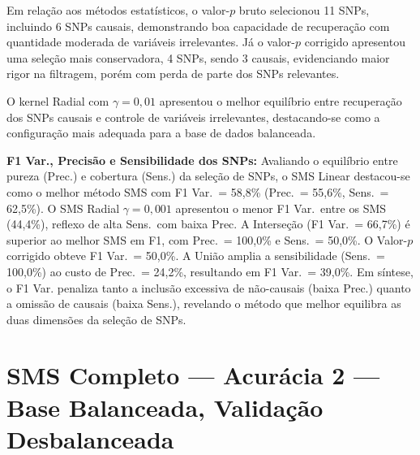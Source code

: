 \documentclass[
    12pt,
    a4paper,
    oneside,
    english,
    french,
    spanish,
    brazil
    ]{abntex2}
\newcommand{\novo}[1]{\textcolor{corNova}{#1}}
\begin{document}
Em relação aos métodos estatísticos, o valor-$p$ bruto selecionou 11 SNPs, incluindo 6 SNPs causais, demonstrando boa capacidade de recuperação com quantidade moderada de variáveis irrelevantes. Já o valor-$p$ corrigido apresentou uma seleção mais conservadora, 4 SNPs, sendo 3 causais, evidenciando maior rigor na filtragem, porém com perda de parte dos SNPs relevantes.

O kernel Radial com $\gamma = 0{,}01$ apresentou o melhor equilíbrio entre recuperação dos SNPs causais e controle de variáveis irrelevantes, destacando-se como a configuração mais adequada para a base de dados balanceada.


\novo{\textbf{F1 Var., Precisão e Sensibilidade dos SNPs:} Avaliando o equilíbrio entre pureza (Prec.) e cobertura (Sens.) da seleção de SNPs, o SMS Linear destacou-se como o melhor método SMS com F1 Var.\ = 58,8\% (Prec.\ = 55,6\%, Sens.\ = 62,5\%). O SMS Radial $\gamma=0{,}001$ apresentou o menor F1 Var.\ entre os SMS (44,4\%), reflexo de alta Sens.\ com baixa Prec. A Interseção (F1 Var.\ = 66,7\%) é superior ao melhor SMS em F1, com Prec.\ = 100,0\% e Sens.\ = 50,0\%. O Valor-$p$ corrigido obteve F1 Var.\ = 50,0\%. A União amplia a sensibilidade (Sens.\ = 100,0\%) ao custo de Prec.\ = 24,2\%, resultando em F1 Var.\ = 39,0\%. Em síntese, o F1 Var. penaliza tanto a inclusão excessiva de não-causais (baixa Prec.) quanto a omissão de causais (baixa Sens.), revelando o método que melhor equilibra as duas dimensões da seleção de SNPs.}
\section{SMS Completo --- Acurácia 2 --- Base Balanceada, Validação Desbalanceada}
\end{document}
